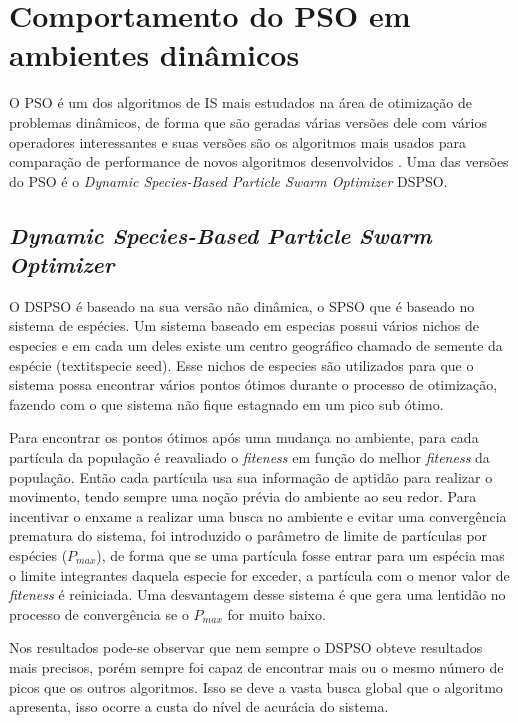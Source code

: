 \section{Comportamento do PSO em ambientes dinâmicos}
\label{sec:pso_behaviour}

O PSO é um dos algoritmos de IS mais estudados na área de otimização de problemas dinâmicos, de forma que são geradas várias versões dele com vários operadores interessantes e suas versões são os algoritmos mais usados para comparação de performance de novos algoritmos desenvolvidos \cite{carlisle2002applying}. Uma das versões do PSO é o \textit{Dynamic Species-Based Particle Swarm Optimizer} DSPSO.

\subsection{\textit{Dynamic Species-Based Particle Swarm Optimizer}}
\label{sec:dspso}

O DSPSO \cite{parrott2006locating} é baseado na sua versão não dinâmica, o SPSO que é baseado no sistema de espécies. Um sistema baseado em especias possui vários nichos de especies e em cada um deles existe um centro geográfico chamado de semente da espécie (textit{specie seed}). Esse nichos de especies são utilizados para que o sistema possa encontrar vários pontos ótimos durante o processo de otimização, fazendo com o que sistema não fique estagnado em um pico sub ótimo.

Para encontrar os pontos ótimos após uma mudança no ambiente, para cada partícula da população é reavaliado o \textit{fiteness} em função do melhor \textit{fiteness} da população. Então cada partícula usa sua informação de aptidão para realizar o movimento, tendo sempre uma noção prévia do ambiente ao seu redor. Para incentivar o enxame a realizar uma busca no ambiente e evitar uma convergência prematura do sistema, foi introduzido o parâmetro de limite de partículas por espécies ($P_{max}$), de forma que se uma partícula fosse entrar para um espécia mas o limite integrantes daquela especie for exceder, a partícula com o menor valor de \textit{fiteness} é reiniciada. Uma desvantagem desse sistema é que gera uma lentidão no processo de convergência se o $P_{max}$ for muito baixo.

Nos resultados pode-se observar que nem sempre o DSPSO obteve resultados mais precisos, porém sempre foi capaz de encontrar mais ou o mesmo número de picos que os outros algoritmos. Isso se deve a vasta busca global que o algoritmo apresenta, isso ocorre a custa do nível de acurácia do sistema.

